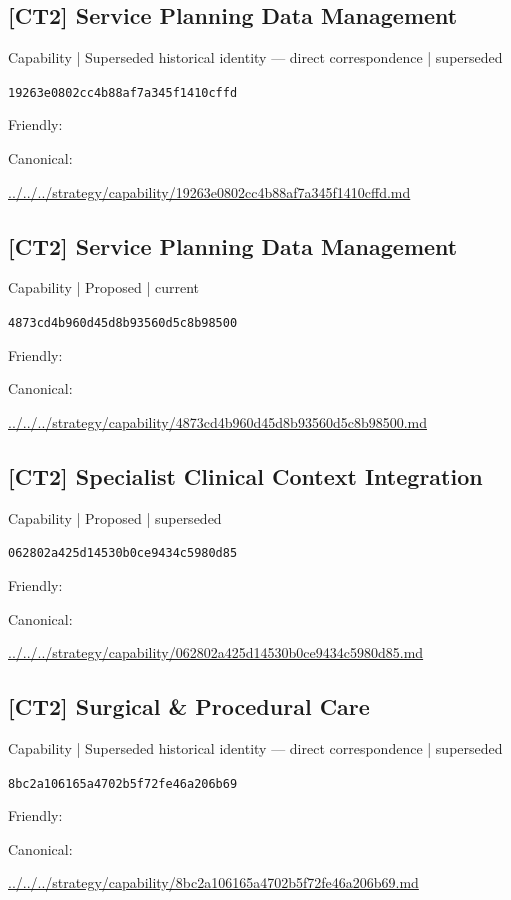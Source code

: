 \documentclass[10pt,a4paper]{article}
\begin{document}
\subsection*{[CT2] Service Planning Data Management}
{\small Capability | Superseded historical identity — direct correspondence | superseded}\par
\texttt{19263e0802cc4b88af7a345f1410cffd}\par
Friendly: \par
Canonical: \par
{\footnotesize\url{../../../strategy/capability/19263e0802cc4b88af7a345f1410cffd.md}}\par
\subsection*{[CT2] Service Planning Data Management}
{\small Capability | Proposed | current}\par
\texttt{4873cd4b960d45d8b93560d5c8b98500}\par
Friendly: \par
Canonical: \par
{\footnotesize\url{../../../strategy/capability/4873cd4b960d45d8b93560d5c8b98500.md}}\par
\subsection*{[CT2] Specialist Clinical Context Integration}
{\small Capability | Proposed | superseded}\par
\texttt{062802a425d14530b0ce9434c5980d85}\par
Friendly: \par
Canonical: \par
{\footnotesize\url{../../../strategy/capability/062802a425d14530b0ce9434c5980d85.md}}\par
\subsection*{[CT2] Surgical \& Procedural Care}
{\small Capability | Superseded historical identity — direct correspondence | superseded}\par
\texttt{8bc2a106165a4702b5f72fe46a206b69}\par
Friendly: \par
Canonical: \par
{\footnotesize\url{../../../strategy/capability/8bc2a106165a4702b5f72fe46a206b69.md}}\par
\end{document}
